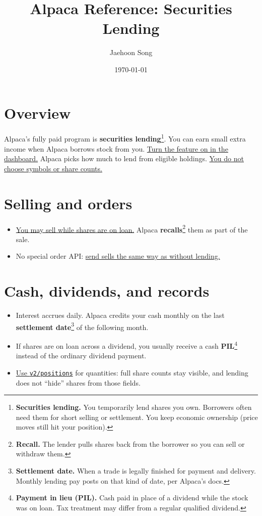 \documentclass{article}
\title{Alpaca Reference: Securities Lending}
\author{Jaehoon Song}
\date{\today}
\begin{document}
\maketitle

\section{Overview}
Alpaca's fully paid program is \textbf{securities lending}\footnote{\textbf{Securities lending.} You temporarily lend shares you own. Borrowers often need them for short selling or settlement. You keep economic ownership (price moves still hit your position).}. You can earn small extra income when Alpaca borrows stock from you. \uline{Turn the feature on in the dashboard.} Alpaca picks how much to lend from eligible holdings. \uline{You do not choose symbols or share counts.}

\section{Selling and orders}
\begin{itemize}
  \item \uline{You may sell while shares are on loan.} Alpaca \textbf{recalls}\footnote{\textbf{Recall.} The lender pulls shares back from the borrower so you can sell or withdraw them.} them as part of the sale.
  \item No special order API: \uline{send sells the same way as without lending.}
\end{itemize}

\section{Cash, dividends, and records}
\begin{itemize}
  \item Interest accrues daily. Alpaca credits your cash monthly on the last \textbf{settlement date}\footnote{\textbf{Settlement date.} When a trade is legally finished for payment and delivery. Monthly lending pay posts on that kind of date, per Alpaca's docs.} of the following month.
  \item If shares are on loan across a dividend, you usually receive a cash \textbf{PIL}\footnote{\textbf{Payment in lieu (PIL).} Cash paid in place of a dividend while the stock was on loan. Tax treatment may differ from a regular qualified dividend.} instead of the ordinary dividend payment.
  \item \uline{Use \texttt{v2/positions}} for quantities: full share counts stay visible, and lending does not ``hide'' shares from those fields.
\end{itemize}
\end{document}
